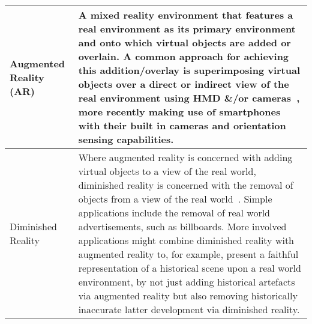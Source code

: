 \begin{center}
\begin{longtable}{ l p{10cm} }
\midrule



		

Augmented Reality (AR) & A mixed reality environment that features a real environment as its primary environment and onto which virtual objects are added or overlain. A common approach for achieving this addition/overlay is superimposing virtual objects over a direct or indirect view of the real environment using HMD \&/or cameras~\cite{Krevelen2010}, more recently making use of smartphones with their built in cameras and orientation sensing capabilities. \\



\midrule


Diminished Reality & Where augmented reality is concerned with adding virtual objects to a view of the real world, diminished reality is concerned with the removal of objects from a view of the real world~\cite{Mann2002}. Simple applications include the removal of real world advertisements, such as billboards. More involved applications might combine diminished reality with augmented reality to, for example, present a faithful representation of a historical scene upon a real world environment, by not just adding historical artefacts via augmented reality but also removing historically inaccurate latter development via diminished reality. \\

\midrule


\end{longtable}
\end{center}
